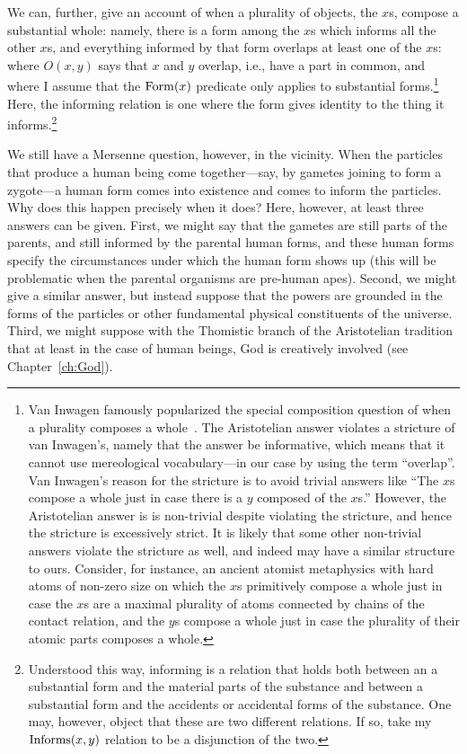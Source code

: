 We can, further, give an account of when a plurality of objects, the $x$s, compose a 
substantial whole: namely, there is a form among the $x$s which informs all the other $x$s, 
and everything informed by that form overlaps at least one of the $x$s:
where $O(x,y)$ says that $x$ and $y$ overlap, i.e., have a part in common, and where I assume
that the $\operatorname{Form}(x)$ predicate only applies to substantial forms.\footnote{Van Inwagen famously popularized the special composition question of when a plurality
composes a whole~\parencite{vanInwagenMaterialBeings}. The Aristotelian answer violates a stricture of van Inwagen's, namely that the answer be informative,
which means that it cannot use mereological vocabulary---in our case by using the term ``overlap''. Van Inwagen's reason for 
the stricture is to avoid trivial answers like ``The $x$s compose a whole just in case there is a $y$ composed of the $x$s.'' 
However, the Aristotelian answer is is non-trivial despite violating the stricture, and hence the stricture is 
excessively strict. It is likely that some other non-trivial answers violate the stricture as well, and indeed may have a similar structure to ours. Consider, for instance, an ancient atomist metaphysics with hard atoms of non-zero size 
on which the $x$s primitively compose a whole just in case the $x$s are a maximal plurality of atoms connected by chains of 
the contact relation, and the $y$s compose a whole just in case the plurality of their atomic parts composes a whole.}
Here, the informing relation is one where the form gives identity to the thing it informs.\footnote{Understood this way, informing is a relation that holds both between an a substantial 
form and the material parts of the substance and between a substantial form and the accidents or 
accidental forms of the substance. One may, however, object that these are two different relations.
If so, take my $\operatorname{Informs}(x,y)$ relation to be a disjunction of the two.}

We still have a Mersenne question, however, in the vicinity. When the particles that 
produce a human being come together---say, by gametes joining to form a zygote---a human form comes into existence
and comes to inform the particles. Why does this happen precisely when it does? Here, however, at least three answers
can be given. First, we might say that the gametes are still parts of the parents, and still informed by the
parental human forms, and these human forms specify the circumstances under which the human form shows up (this
will be problematic when the parental organisms are pre-human apes). Second, 
we might give a similar answer, but instead suppose that the powers
are grounded in the forms of the particles or other fundamental physical constituents of the universe.
Third, we might suppose with the Thomistic branch of the Aristotelian tradition that at least in the case of human
beings, God is creatively involved (see Chapter~\ref{ch:God}).

